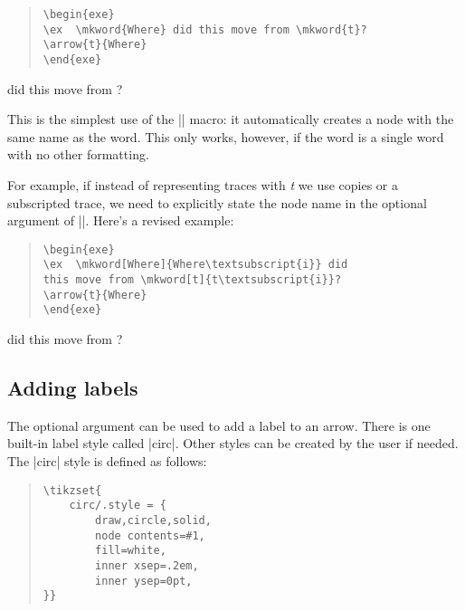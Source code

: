 \documentclass[11pt]{article}
\begin{document}
\begin{quote}
\begin{lstlisting}
\begin{exe}
\ex  \mkword{Where} did this move from \mkword{t}?
\arrow{t}{Where}
\end{exe}
\end{lstlisting}
\end{quote}

\begin{exe}
\ex  {} did this move from ?
\label{where}
\end{exe}

This is the simplest use of the |\mkword| macro: it automatically creates a node with the same name as the word.  This only works, however, if the word is a single word with no other formatting. 

For example, if instead of representing traces with \emph{t} we use copies or a subscripted trace, we need to explicitly state the node name in the optional argument of |\mkword|.  Here’s a revised example:
\clearpage
\begin{quote}
\begin{lstlisting}
\begin{exe}
\ex  \mkword[Where]{Where\textsubscript{i}} did 
this move from \mkword[t]{t\textsubscript{i}}?
\arrow{t}{Where}
\end{exe}
\end{lstlisting}
\end{quote}

\begin{exe}
\ex  {} did this move from ?
\label{where2}
\end{exe}
\subsection{Adding labels}
The optional argument can be used to add a label to an arrow.  There is one built-in label style called |circ|. Other styles can be created by the user if needed.  The |circ| style is defined as follows:

\begin{quote}
\begin{lstlisting}
\tikzset{
	circ/.style = {
  		draw,circle,solid,
  		node contents=#1,
  		fill=white,
  		inner xsep=.2em,
  		inner ysep=0pt,
}}
\end{lstlisting}
\end{quote}
\end{document}

